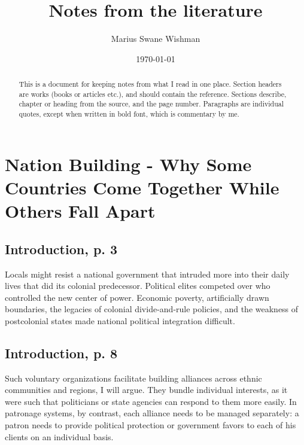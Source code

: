 \documentclass[12pt]{article}
\title{Notes from the literature}
\author[1]{Marius Swane Wishman}
\affil[1]{Department of Sociology and Political Science, NTNU}
\date{\today}
\begin{document}
\maketitle

\begin{abstract}

	This is a document for keeping notes from what I read in one place.
	Section headers are works (books or articles etc.), and should contain
	the reference. Sections describe, chapter or heading from the source,
	and the page number. Paragraphs are individual quotes, except when
	written in bold font, which is commentary by me.

\end{abstract}

\pagebreak

\tableofcontents

\pagebreak

\onehalfspacing
\section{Nation Building - Why Some Countries Come Together While Others Fall 
	Apart \citep{Wimmer_2018}}

\subsection{Introduction, p. 3}

Locals might resist a national government that intruded more into their daily
lives that did its colonial predecessor.  Political elites competed over who
controlled the new center of power.  Economic poverty, artificially drawn
boundaries, the legacies of colonial divide-and-rule policies, and the weakness
of postcolonial states made national political integration difficult.

\subsection{Introduction, p. 8}

Such voluntary organizations facilitate building alliances across ethnic
communities and regions, I will argue.  They bundle individual interests, as it
were such that politicians or state agencies can respond to them more easily.
In patronage systems, by contrast, each alliance needs to be managed separately:
a patron needs to provide political protection or government favors to each of
his clients on an individual basis.
\end{document}
